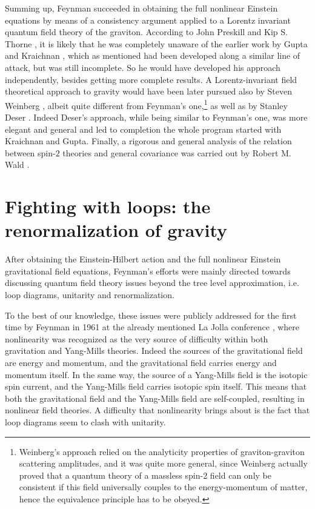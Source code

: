 \documentclass{ws-procs961x669}            %
\begin{document}
Summing up, Feynman succeeded in obtaining the full nonlinear
Einstein equations by means of a consistency argument applied to a
Lorentz invariant quantum field theory of the graviton. According
to John Preskill and Kip S. Thorne \cite{LectGravPreface}, it is
likely that he was completely unaware of the earlier work by Gupta
\cite{Gupta:1954zz} and Kraichnan \cite{Kraichnan:1955zz}, which
as mentioned had been developed along a similar line of attack,
but was still incomplete. So he would have developed his approach
independently, besides getting more complete results. A
Lorentz-invariant field theoretical approach to gravity would have
been later pursued also by Steven Weinberg
\cite{Weinberg:1964kqu,Weinberg:1965rz}, albeit quite different
from Feynman's one,\footnote{Weinberg's approach relied on the
analyticity properties of graviton-graviton scattering amplitudes,
and it was quite more general, since Weinberg actually proved that
a quantum theory of a massless spin-2 field can only be consistent
if this field universally couples to the energy-momentum of
matter, hence the equivalence principle has to be obeyed.} as well
as by Stanley Deser
\cite{Deser:1969wk,Boulware:1974sr,Deser87,Deser:2009fq}. Indeed
Deser's approach, while being similar to Feynman's one, was more
elegant and general and led to completion the whole program
started with Kraichnan and Gupta. Finally, a rigorous and general
analysis of the relation between spin-$2$ theories and general
covariance was carried out by Robert M. Wald \cite{Wald:1986bj}.



\section{Fighting with loops: the renormalization of gravity}
After obtaining the Einstein-Hilbert action and the full nonlinear
Einstein gravitational field equations, Feynman's efforts were
mainly directed towards discussing quantum field theory issues
beyond the tree level approximation, i.e. loop diagrams, unitarity
and renormalization.

To the best of our knowledge, these issues were publicly addressed
for the first time by Feynman in 1961 at the already mentioned La
Jolla conference \cite{LaJolla}, where nonlinearity was recognized
as the very source of difficulty within both gravitation and
Yang-Mills theories. Indeed the sources of the gravitational field
are energy and momentum, and the gravitational field carries
energy and momentum itself. In the same way, the source of a
Yang-Mills field is the isotopic spin current, and the Yang-Mills
field carries isotopic spin itself. This means that both the
gravitational field and the Yang-Mills field are self-coupled,
resulting in nonlinear field theories. A difficulty that
nonlinearity brings about is the fact that loop diagrams seem to
clash with unitarity.
\end{document}
